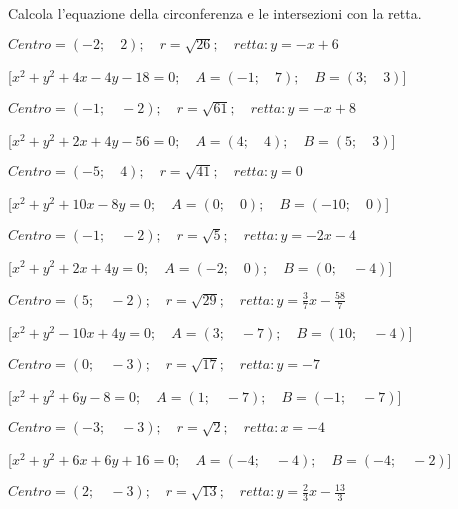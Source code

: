 \begin{esercizio}\label{ese:}
 Calcola l'equazione della circonferenza e le intersezioni con la retta.
 \begin{enumeratea}
  \item  \(Centro=\left (-2; \quad 2 \right ); \quad r = \sqrt{26}; \quad 
retta: y = - x +6\)

   \hfill [\(x^2 + y^2 +4x -4y -18 = 0; \quad A = \left (-1; \quad 7 \right ); 
\quad B = \left (3; \quad 3 \right )\)]

  \item  \(Centro=\left (-1; \quad -2 \right ); \quad r = \sqrt{61}; \quad 
retta: y = - x +8\)

   \hfill [\(x^2 + y^2 +2x +4y -56 = 0; \quad A = \left (4; \quad 4 \right ); 
\quad B = \left (5; \quad 3 \right )\)]

  \item  \(Centro=\left (-5; \quad 4 \right ); \quad r = \sqrt{41}; \quad 
retta: y = 0\)

   \hfill [\(x^2 + y^2 +10x -8y  = 0; \quad A = \left (0; \quad 0 \right ); 
\quad B = \left (-10; \quad 0 \right )\)]

  \item  \(Centro=\left (-1; \quad -2 \right ); \quad r = \sqrt{5}; \quad 
retta: y = -2 x -4\)

   \hfill [\(x^2 + y^2 +2x +4y  = 0; \quad A = \left (-2; \quad 0 \right ); 
\quad B = \left (0; \quad -4 \right )\)]

  \item  \(Centro=\left (5; \quad -2 \right ); \quad r = \sqrt{29}; \quad 
retta: y = \frac{3}{7} x -\frac{58}{7}\)

   \hfill [\(x^2 + y^2 -10x +4y  = 0; \quad A = \left (3; \quad -7 \right ); 
\quad B = \left (10; \quad -4 \right )\)]

  \item  \(Centro=\left (0; \quad -3 \right ); \quad r = \sqrt{17}; \quad 
retta: y = -7\)

   \hfill [\(x^2 + y^2 +6y -8 = 0; \quad A = \left (1; \quad -7 \right ); \quad 
B = \left (-1; \quad -7 \right )\)]

  \item  \(Centro=\left (-3; \quad -3 \right ); \quad r = \sqrt{2}; \quad 
retta: x = -4\)

   \hfill [\(x^2 + y^2 +6x +6y +16 = 0; \quad A = \left (-4; \quad -4 \right ); 
\quad B = \left (-4; \quad -2 \right )\)]

  \item  \(Centro=\left (2; \quad -3 \right ); \quad r = \sqrt{13}; \quad 
retta: y = \frac{2}{3} x -\frac{13}{3}\)


\end{enumeratea}
\end{esercizio}
